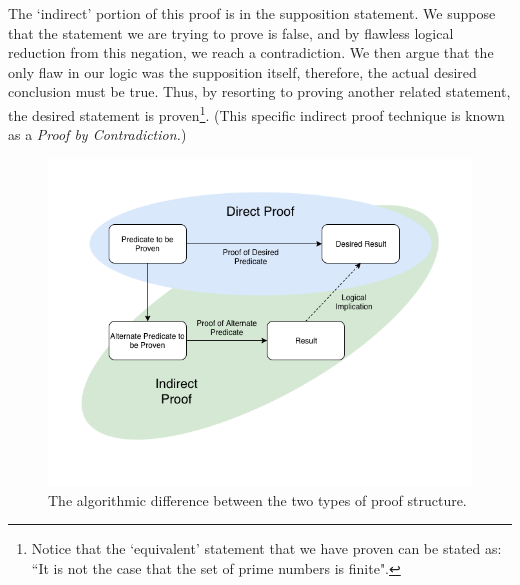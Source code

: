 \documentclass[../proofs.tex]{subfiles}
\begin{document}
The `indirect' portion of this proof is in the supposition statement. We suppose that the statement we are trying to prove is false, and by flawless logical reduction from this negation, we reach a contradiction. We then argue that the only flaw in our logic was the supposition itself, therefore, the actual desired conclusion must be true. Thus, by resorting to proving another related statement, the desired statement is proven\footnote{Notice that the `equivalent' statement that we have proven can be stated as: ``It is not the case that the set of prime numbers is finite".}. (This specific indirect proof technique is known as a \emph{Proof by Contradiction.})

\begin{figure}[h]
\centering
\includegraphics[scale=0.45]{res/direct_indirect.png}
\caption{The algorithmic difference between the two types of proof structure.}
\end{figure}
\end{document}
